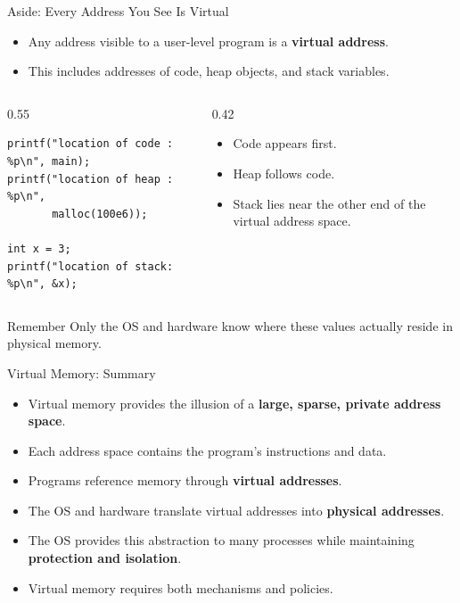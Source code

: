 \begin{frame}[fragile]{Aside: Every Address You See Is Virtual}
    \begin{itemize}
        \item Any address visible to a user-level program is a
              \textbf{virtual address}.
        \item This includes addresses of code, heap objects, and
              stack variables.
    \end{itemize}

    \begin{columns}
        \begin{column}{0.55\textwidth}
\begin{footnotesize}
\begin{verbatim}
printf("location of code : %p\n", main);
printf("location of heap : %p\n",
       malloc(100e6));

int x = 3;
printf("location of stack: %p\n", &x);
\end{verbatim}
\end{footnotesize}
        \end{column}

        \begin{column}{0.42\textwidth}
            \begin{itemize}
                \item Code appears first.
                \item Heap follows code.
                \item Stack lies near the other end of the
                      virtual address space.
            \end{itemize}
        \end{column}
    \end{columns}

    \begin{alertblock}{Remember}
        Only the OS and hardware know where these values actually
        reside in physical memory.
    \end{alertblock}
\end{frame}


\begin{frame}{Virtual Memory: Summary}
    \begin{itemize}
        \item Virtual memory provides the illusion of a
              \textbf{large, sparse, private address space}.
        \item Each address space contains the program's instructions
              and data.
        \item Programs reference memory through
              \textbf{virtual addresses}.
        \item The OS and hardware translate virtual addresses into
              \textbf{physical addresses}.
        \item The OS provides this abstraction to many processes
              while maintaining \textbf{protection and isolation}.
        \item Virtual memory requires both mechanisms and policies.
    \end{itemize}
\end{frame}